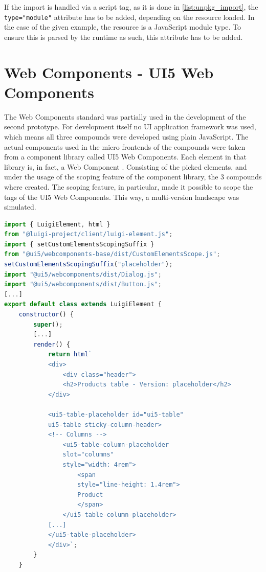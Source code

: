 If the import is handled via a script tag, as it is done in \ref{list:unpkg_import}, the \texttt{type="module"} attribute has to be added, depending on the resource loaded.
In the case of the given example, the resource is a JavaScript module type. To ensure this is parsed by the runtime as such, this attribute has to be added.\cite{js_module_type}

\section{Web Components - UI5 Web Components} 

The Web Components standard was partially used in the development of the second prototype. 
For development itself no UI application framework was used, which means all three compounds were developed using plain JavaScript. 
The actual components used in the micro frontends of the compounds were taken from a component library called UI5 Web Components. 
Each element in that library is, in fact, a Web Component \cite{ui5_wc_github}.
Consisting of the picked elements, and under the usage of the scoping feature of the component library, the 3 compounds where created. 
The scoping feature, in particular, made it possible to scope the tags of the UI5 Web Components. 
This way, a multi-version landscape was simulated.\cite{ui5_webcomponents_scoping}

\begin{lstlisting}[language=JavaScript,caption=Scoping feature used in the prototype, label=list:scoping_wc_prototype,  xleftmargin=.0\textwidth, xrightmargin=.0\textwidth]
import { LuigiElement, html } 
from "@luigi-project/client/luigi-element.js";
import { setCustomElementsScopingSuffix } 
from "@ui5/webcomponents-base/dist/CustomElementsScope.js";
setCustomElementsScopingSuffix("placeholder");
import "@ui5/webcomponents/dist/Dialog.js";
import "@ui5/webcomponents/dist/Button.js";
[...]
export default class extends LuigiElement {
	constructor() {
		super();
		[...]
		render() {
			return html`
			<div>
				<div class="header">
				<h2>Products table - Version: placeholder</h2>
			</div>
			
			<ui5-table-placeholder id="ui5-table" 
			ui5-table sticky-column-header>
			<!-- Columns -->
				<ui5-table-column-placeholder 
				slot="columns" 
				style="width: 4rem">
					<span 
					style="line-height: 1.4rem">
					Product
					</span>
				</ui5-table-column-placeholder>
			[...]
			</ui5-table-placeholder>
			</div>`;
		}
	}
\end{lstlisting}
	
